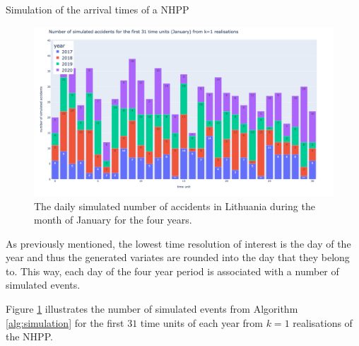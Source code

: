\documentclass[12pt]{article}
\DeclarePairedDelimiter\floor{\lfloor}{\rfloor}
\theoremstyle{definition}
\begin{document}
\begin{algorithm}
  \caption{Simulation of the arrival times of a NHPP}
  \label{alg:simulation}
  \begin{algorithmic}
    \EndWhile
  \end{algorithmic}
\end{algorithm}

\begin{figure}
    \centering
    \includegraphics[width=13.5cm]{images/simulation_result_1.png}
    \caption{The daily simulated number of accidents in Lithuania during the month of January for the four years.}
    \label{fig:JanuarySimulation}
\end{figure}


As previously mentioned, the lowest time resolution of interest is the day of the year and thus the generated variates are rounded into the day that they belong to. This way, each day of the four year period is associated with a number of simulated events. 

Figure \ref{fig:JanuarySimulation} illustrates the number of simulated events from Algorithm \ref{alg:simulation} for the first $31$ time units of each year from $k=1$ realisations of the NHPP.
\end{document}
